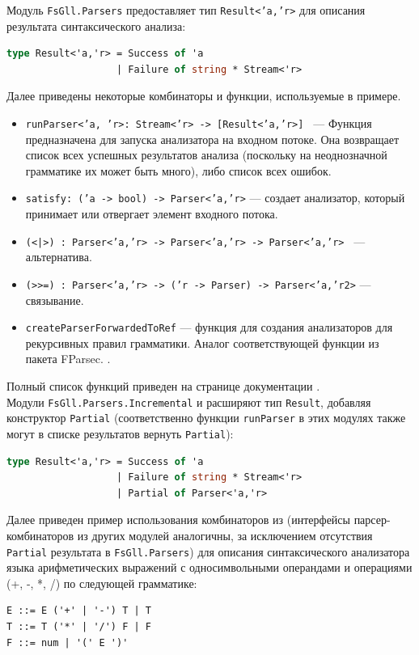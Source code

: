 \documentclass[14pt]{matmex-diploma}
\begin{document}
Модуль {\tt FsGll.Parsers} предоставляет тип {\tt Result<'a,'r>} для описания результата синтаксического анализа:
\begin{lstlisting}[language=FSharp]
type Result<'a,'r> = Success of 'a
    	           | Failure of string * Stream<'r>
\end{lstlisting}

Далее приведены некоторые комбинаторы и функции, используемые в примере.
\begin{itemize}
    \item {\tt runParser<'a, 'r>: Stream<'r> -> [Result<'a,'r>] } --- Функция  предназначена для запуска анализатора на входном потоке. Она возвращает список всех успешных результатов анализа (поскольку на неоднозначной грамматике их может быть много), либо список всех ошибок.
    \item {\tt satisfy: ('a -> bool) -> Parser<'a,'r>} --- создает анализатор, который принимает или отвергает элемент входного потока.
    \item {\tt (<|>) : Parser<'a,'r> -> Parser<'a,'r> -> Parser<'a,'r> } --- альтернатива.
    \item {\tt (>}{\tt >=) : Parser<'a,'r> -> ('r -> Parser) -> Parser<'a,'r2>} --- связывание.
    \item {\tt createParserForwardedToRef} --- функция для создания анализаторов для рекурсивных правил грамматики. Аналог соответствующей функции из пакета FParsec.
        \cite{fparsec:createpforwtoref}.
\end{itemize}
Полный список функций приведен на странице документации \cite{fsglldoc}.\\

Модули {\tt FsGll.Parsers.Incremental} и  
расширяют тип {\tt Result}, добавляя конструктор {\tt Partial} 
(соответственно функции {\tt runParser} в этих модулях также могут 
в списке результатов вернуть {\tt Partial}):

\begin{lstlisting}[language=FSharp]
type Result<'a,'r> = Success of 'a
    	           | Failure of string * Stream<'r>
                   | Partial of Parser<'a,'r>
\end{lstlisting}

Далее приведен пример использования комбинаторов из  
(интерфейсы парсер-комбинаторов из других модулей аналогичны, за исключением
отсутствия {\tt Partial} результата в {\tt FsGll.Parsers}) для описания синтаксического анализатора языка арифметических выражений с односимвольными операндами и операциями (+, -, *, /) по следующей грамматике:
\begin{lstlisting}
E ::= E ('+' | '-') T | T
T ::= T ('*' | '/') F | F
F ::= num | '(' E ')' 
\end{lstlisting}
\end{document}

